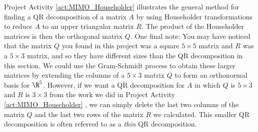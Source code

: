 Project Activity \ref{act:MIMO_Householder} illustrates the general method for finding a QR decomposition of a matrix $A$ by using Householder transformations to reduce $A$ to an upper triangular matrix $R$. The product of the Householder matrices is then the orthogonal matrix $Q$. One final note: You may have noticed that the matrix $Q$ you found in this project was a square $5 \times 5$ matrix and $R$ was a $5 \times 3$ matrix, and so they have different sizes than the QR decomposition in this section. We could use the Gram-Schmidt process to obtain these larger matrices by extending the columns of a $5 \times 3$ matrix $Q$ to form an orthonormal basis for $\R^5$. However, if we want a QR decomposition for $A$ in which $Q$ is $5 \times 3$ and $R$ is $3 \times 3$ from the work we did in Project Activity \ref{act:MIMO_Householder} , we can simply delete the last two columns of the matrix $Q$ and the last two rows of the matrix $R$ we calculated. This smaller QR decomposition is often referred to as a \emph{thin} QR decomposition.  




